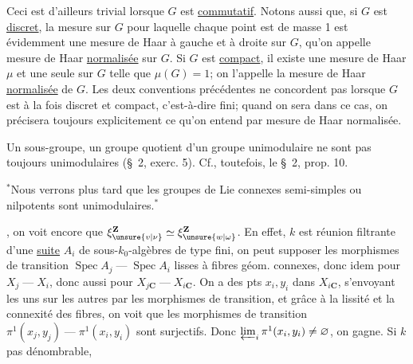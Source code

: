 Ceci est d'ailleurs trivial lorsque $G$ est \uline{commutatif}.
Notons aussi que, si $G$ est \uline{discret}, la mesure sur $G$ pour laquelle chaque point est de masse 1 est évidemment une mesure de Haar à gauche et à droite sur $G$, qu'on appelle mesure de Haar \uline{normalisée} sur $G$.
Si $G$ est \uline{compact}, il existe une mesure de Haar $\mu$ et une seule sur $G$ telle que $\mu(G)=1$; on l'appelle la mesure de Haar \uline{normalisée} de $G$.
Les deux conventions précédentes ne concordent pas lorsque $G$ est à la fois discret et compact, c'est-à-dire fini; quand on sera dans ce cas, on précisera toujours explicitement ce qu'on entend par mesure de Haar normalisée.

Un sous-groupe, un groupe quotient d'un groupe unimodulaire ne sont pas toujours unimodulaires (\S\ 2, exerc. 5). Cf., toutefois, le \S\ 2, prop. 10.

$^*$Nous verrons plus tard que les groupes de Lie connexes semi-simples ou nilpotents sont unimodulaires.$^*$

, on voit encore que
$\xi_{\unsure{v|\nu}}^{\mathbf Z}\simeq\xi_{\unsure{w|\omega}}^{\mathbf Z}$.
En effet, $k$ est réunion filtrante d’une \uline{suite} $A_i$ de sous-$k_0$-algèbres de type fini,
on peut supposer les morphismes de transition
$\operatorname{Spec}A_j\mathbin{—}\operatorname{Spec}A_i$
lisses à fibres géom. connexes, donc idem pour $X_j\mathbin{—}X_i$,
donc aussi pour $X_{j\mathbf C}\mathbin{—}X_{i\mathbf C}$.
On a des pts $x_i,y_i$ dans $X_{i\mathbf C}$, s’envoyant les uns sur les autres par les
morphismes de transition, et grâce à la lissité et la connexité des fibres,
on voit que les morphismes de transition
$\pi^1(x_j,y_j)\mathbin{—}\pi^1(x_i,y_i)$ sont surjectifs.
Donc $\varprojlim_i\pi^1(x_i,y_i)\ne\varnothing$, on gagne.
Si $k$ pas dénombrable,

